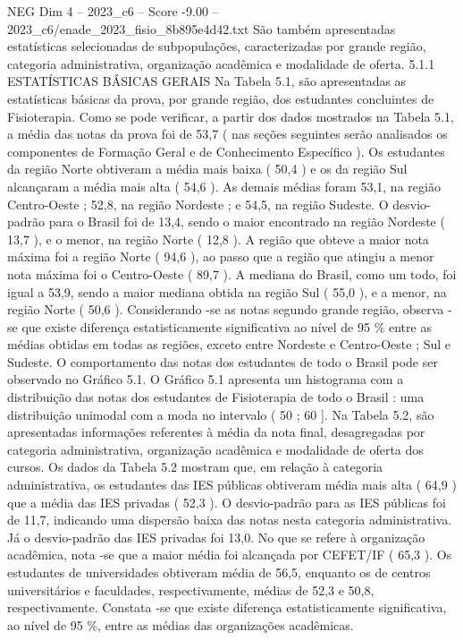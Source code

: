 \begin{textsample}{NEG Dim 4 – 2023\_c6 – Score -9.00 – 2023\_c6/enade\_2023\_fisio\_8b895e4d42.txt}
São também apresentadas estatísticas selecionadas de subpopulações, caracterizadas por grande região, categoria administrativa, organização acadêmica e modalidade de oferta. 5.1.1 ESTATÍSTICAS BÁSICAS GERAIS Na Tabela 5.1, são apresentadas as estatísticas básicas da prova, por grande região, dos estudantes concluintes de Fisioterapia.
Como se pode verificar, a partir dos dados mostrados na Tabela 5.1, a média das notas da prova foi de 53,7 ( nas seções seguintes serão analisados os componentes de Formação Geral e de Conhecimento Específico ).
Os estudantes da região Norte obtiveram a média mais baixa ( 50,4 ) e os da região Sul alcançaram a média mais alta ( 54,6 ).
As demais médias foram 53,1, na região Centro-Oeste ; 52,8, na região Nordeste ; e 54,5, na região Sudeste.
O desvio-padrão para o Brasil foi de 13,4, sendo o maior encontrado na região Nordeste ( 13,7 ), e o menor, na região Norte ( 12,8 ).
A região que obteve a maior nota máxima foi a região Norte ( 94,6 ), ao passo que a região que atingiu a menor nota máxima foi o Centro-Oeste ( 89,7 ).
A mediana do Brasil, como um todo, foi igual a 53,9, sendo a maior mediana obtida na região Sul ( 55,0 ), e a menor, na região Norte ( 50,6 ).
Considerando -se as notas segundo grande região, observa -se que existe diferença estatisticamente significativa ao nível de 95 \% entre as médias obtidas em todas as regiões, exceto entre Nordeste e Centro-Oeste ; Sul e Sudeste.
O comportamento das notas dos estudantes de todo o Brasil pode ser observado no Gráfico 5.1.
O Gráfico 5.1 apresenta um histograma com a distribuição das notas dos estudantes de Fisioterapia de todo o Brasil : uma distribuição unimodal com a moda no intervalo ( 50 ; 60 ].
Na Tabela 5.2, são apresentadas informações referentes à média da nota final, desagregadas por categoria administrativa, organização acadêmica e modalidade de oferta dos cursos.
Os dados da Tabela 5.2 mostram que, em relação à categoria administrativa, os estudantes das IES públicas obtiveram média mais alta ( 64,9 ) que a média das IES privadas ( 52,3 ).
O desvio-padrão para as IES públicas foi de 11,7, indicando uma dispersão baixa das notas nesta categoria administrativa.
Já o desvio-padrão das IES privadas foi 13,0.
No que se refere à organização acadêmica, nota -se que a maior média foi alcançada por CEFET/IF ( 65,3 ).
Os estudantes de universidades obtiveram média de 56,5, enquanto os de centros universitários e faculdades, respectivamente, médias de 52,3 e 50,8, respectivamente.
Constata -se que existe diferença estatisticamente significativa, ao nível de 95 \%, entre as médias das organizações acadêmicas.

\end{textsample}
